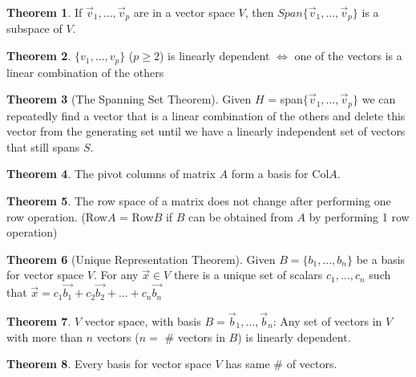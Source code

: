 \documentclass[a4paper,12pt]{article}
\theoremstyle{definition}
\newtheorem{theorem}{Theorem}
\theoremstyle{definition}
\newcommand{\finitevecs}[2]{#1_1,\ldots,#1_#2}
\newcommand{\finitevecsset}[2]{\{\finitevecs{#1}{#2}\}}
\newcommand{\finiteadd}[3]{#1 + #2 + \ldots + #3}
\begin{document}
	\begin{theorem}
		\label{thm:span-subspace-thm}
		If $\finitevecs{\vec{v}}{p}$ are in a vector space $V$, then $Span\finitevecsset{\vec{v}}{p}$ is a subspace of $V$.
	\end{theorem}
	
	\begin{theorem}
		\label{thm:lin-dep-vec-set-thm}
		$\finitevecsset{v}{p}$ ($p \geq 2$) is linearly dependent $\Leftrightarrow$ one of the vectors is a linear combination of the others
	\end{theorem}
	
	\begin{theorem}[The Spanning Set Theorem]
		\label{thm:spanning-set-thm}
		Given $H$ = span$\finitevecsset{\vec{v}}{p}$ we can repeatedly find a vector that is a linear combination of the others and delete this vector from the generating set until we have a linearly independent set of vectors that still spans $S$.
	\end{theorem}
	
	\begin{theorem}
		\label{thm:basis-col-space-thm}
		The pivot columns of matrix $A$ form a basis for Col$A$.
	\end{theorem}
	
	\begin{theorem}
		\label{thm:row-space-equiv-thm}
		The row space of a matrix does not change after performing one row operation. (Row$A$ = Row$B$ if $B$ can be obtained from $A$ by performing 1 row operation)
	\end{theorem}
	
	\begin{theorem}[Unique Representation Theorem]
		\label{thm:uniq-rep-thm}
		Given $B = \finitevecsset{b}{n}$ be a basis for vector space $V$. For any $\vec{x} \in V$ there is a unique set of scalars $\finitevecs{c}{n}$ such that $\vec{x} = \finiteadd{c_1\vec{b_1}}{c_2\vec{b_2}}{c_n\vec{b_n}}$
	\end{theorem}
	
	\begin{theorem}
		\label{thm:vec-spc-lin-dep}
		$V$ vector space, with basis $B = \finitevecs{\vec{b}}{n}$: Any set of vectors in $V$ with more than $n$ vectors ($n =$ \# vectors in $B$) is linearly dependent.
	\end{theorem}
	
	\begin{theorem}
		\label{thm:vec-spc-same-num-vec-thm}
		Every basis for vector space $V$ has same \# of vectors.
	\end{theorem}
	
\end{document}
